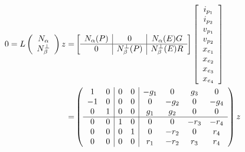 
\begin{equation}\label{K4Equation}
\begin{split}
  0=L\left(\begin{array}{cc} {\ensuremath{N_{\alpha}}} \\ {N_{\beta}^{\perp}}  \end{array}\right)z
    =& \left[\begin{array}{c|c|c} N_{\alpha}(P)  &  0  &  N_{\alpha}(E)G \\  \hline
        0  & N_{\beta}^{\perp}(P)  &  N_{\beta}^{\perp}(E)R \end{array}\right]
    \left[ \begin{array}{c} i_{p_1} \\ i_{p_2} \\ v_{p_1} \\ v_{p_2} \\ x_{e_1} \\ x_{e_2} \\ x_{e_3} \\ x_{e_4}
      \end{array}
      \right]
    \\
    =&
\left(\begin{array}{cc|cc|cccc}
  1 & 0  & 0  & 0  & -g_{1} & 0     & g_{3}  & 0 \\
  -1 & 0  & 0  & 0  &  0    & -g_{2} & 0      & -g_{4} \\
  0  & 1 & 0  & 0  & g_{1} & g_{2} & 0      & 0 \\ \hline
  0  & 0  & 1 & 0  & 0     & 0      & -r_{3} & -r_{4} \\
  0  & 0  & 0  & 1 & 0     & -r_{2}  & 0     & r_{4} \\
  0  & 0  & 0  & 0  & r_{1} & -r_{2}  & r_{3} & r_{4}
  \end{array}\right)z
\end{split}
\end{equation}


